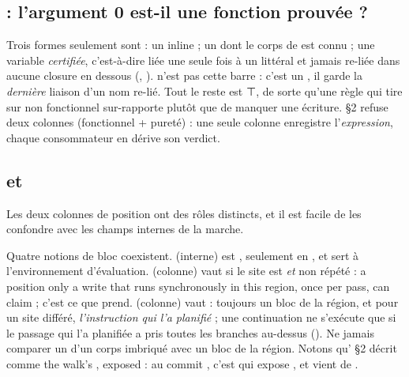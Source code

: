 \subsection{ : l'argument 0 est-il une fonction prouvée ?}



Trois formes seulement sont  : un  inline ; un  dont le corps de  est connu ; une variable \emph{certifiée}, c'est-à-dire liée une seule fois à un littéral et jamais re-liée dans aucune closure en dessous (, ).  n'est pas cette barre : c'est un , il garde la \emph{dernière} liaison d'un nom re-lié. Tout le reste est ⊤, de sorte qu'une règle qui tire sur \og non fonctionnel\fg{} sur-rapporte plutôt que de manquer une écriture.  §2 refuse deux colonnes (fonctionnel + pureté) : une seule colonne enregistre l'\emph{expression}, chaque consommateur en dérive son verdict.

\subsection{ et }

Les deux colonnes de position ont des rôles distincts, et il est facile de les confondre avec les champs internes de la marche.

\begin{piege}
Quatre notions de bloc coexistent.  (interne) est , seulement en , et sert à l'environnement d'évaluation.  (colonne) vaut  si le site est  \emph{et} non répété : \og a position only a write that runs synchronously in this region, once per pass, can claim\fg{} ; c'est ce que  prend.  (colonne) vaut  : toujours un bloc de la région, et pour un site différé, \emph{l'instruction qui l'a planifié} ; une continuation ne s'exécute que si le passage qui l'a planifiée a pris toutes les branches au-dessus (). Ne jamais comparer un  d'un corps imbriqué avec un bloc de la région. Notons qu' §2 décrit  comme \og the walk's , exposed\fg{} : au commit \snapshotCommit, c'est  qui expose , et  vient de .
\end{piege}

